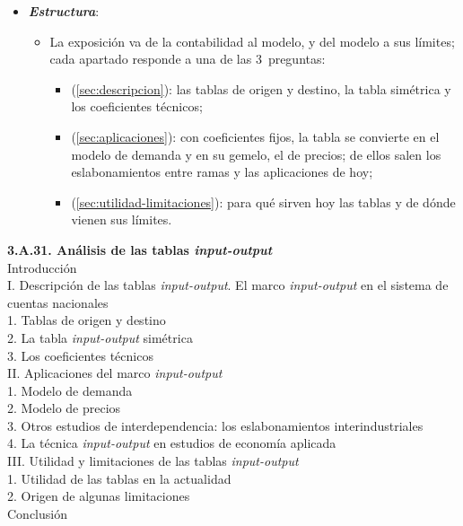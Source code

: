 \documentclass[11pt]{article}
\begin{document}
\begin{itemize}
\item \textbf{\emph{Estructura}}:
  \begin{itemize}
  \item La exposición va de la contabilidad al modelo, y del modelo a sus límites; cada apartado responde a una de las 3~preguntas:
    \begin{itemize}
    \item {} (\ref{sec:descripcion}): las tablas de origen y destino, la tabla simétrica y los coeficientes técnicos;
    \item {} (\ref{sec:aplicaciones}): con coeficientes fijos, la tabla se convierte en el modelo de demanda y en su gemelo, el de precios; de ellos salen los eslabonamientos entre ramas y las aplicaciones de hoy;
    \item {} (\ref{sec:utilidad-limitaciones}): para qué sirven hoy las tablas y de dónde vienen sus límites.
    \end{itemize}
  \end{itemize}
\end{itemize}

\begin{esquema}[unbreakable]
\textbf{3.A.31. Análisis de las tablas \emph{input-output}}\\[2pt]
Introducción\\
I. Descripción de las tablas \emph{input-output}. El marco \emph{input-output} en el sistema de cuentas nacionales\\
\hspace*{1.5em}1. Tablas de origen y destino\\
\hspace*{1.5em}2. La tabla \emph{input-output} simétrica\\
\hspace*{1.5em}3. Los coeficientes técnicos\\
II. Aplicaciones del marco \emph{input-output}\\
\hspace*{1.5em}1. Modelo de demanda\\
\hspace*{1.5em}2. Modelo de precios\\
\hspace*{1.5em}3. Otros estudios de interdependencia: los eslabonamientos interindustriales\\
\hspace*{1.5em}4. La técnica \emph{input-output} en estudios de economía aplicada\\
III. Utilidad y limitaciones de las tablas \emph{input-output}\\
\hspace*{1.5em}1. Utilidad de las tablas en la actualidad\\
\hspace*{1.5em}2. Origen de algunas limitaciones\\
Conclusión
\end{esquema}
\end{document}
